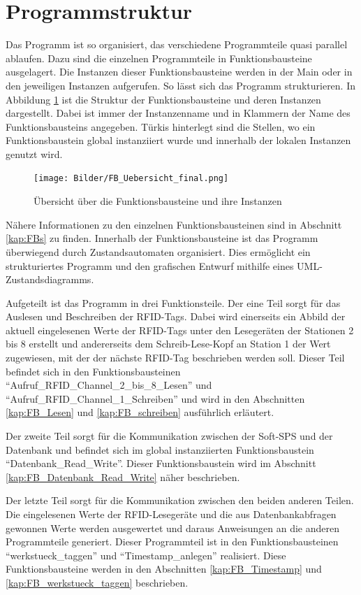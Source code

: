 \section{Programmstruktur}
\label{kap:KonzeptFertigungsueberwachung}
Das Programm ist so organisiert, das verschiedene Programmteile quasi parallel ablaufen. Dazu sind die einzelnen Programmteile in Funktionsbausteine ausgelagert. Die Instanzen dieser Funktionsbausteine werden in der Main oder in den jeweiligen Instanzen aufgerufen. So lässt sich das Programm strukturieren. In Abbildung \ref{fig:FB_Uebersicht} ist die Struktur der Funktionsbausteine und deren Instanzen dargestellt. Dabei ist immer der Instanzenname und in Klammern der Name des Funktionsbausteins angegeben. Türkis hinterlegt sind die Stellen, wo ein Funktionsbaustein global instanziiert wurde und innerhalb der lokalen Instanzen genutzt wird.
\begin{figure}[h]
	    \centering
	    \texttt{[image: Bilder/FB\_Uebersicht\_final.png]}
        \caption{Übersicht über die Funktionsbausteine und ihre Instanzen}
        \label{fig:FB_Uebersicht}
\end{figure}
Nähere Informationen zu den einzelnen Funktionsbausteinen sind in Abschnitt \ref{kap:FBs} zu finden. Innerhalb der Funktionsbausteine ist das Programm überwiegend durch Zustandsautomaten organisiert. Dies ermöglicht ein strukturiertes Programm und den grafischen Entwurf mithilfe eines UML-Zustandsdiagramms.

Aufgeteilt ist das Programm in drei Funktionsteile. Der eine Teil sorgt für das Auslesen und Beschreiben der RFID-Tags. Dabei wird einerseits ein Abbild der aktuell eingelesenen Werte der RFID-Tags unter den Lesegeräten der Stationen 2 bis 8 erstellt und andererseits dem Schreib-Lese-Kopf an Station 1 der Wert zugewiesen, mit der der nächste RFID-Tag beschrieben werden soll. Dieser Teil befindet sich in den Funktionsbausteinen "`Aufruf\_RFID\_Channel\_2\_bis\_8\_Lesen"' und "`Aufruf\_RFID\_Channel\_1\_Schreiben"' und wird in den Abschnitten \ref{kap:FB_Lesen} und \ref{kap:FB_schreiben} ausführlich erläutert. 

Der zweite Teil sorgt für die Kommunikation zwischen der Soft-SPS und der Datenbank und befindet sich im global instanziierten Funktionsbaustein "`Datenbank\_Read\_Write"'. Dieser Funktionsbaustein wird im Abschnitt \ref{kap:FB_Datenbank_Read_Write} näher beschrieben. 

Der letzte Teil sorgt für die Kommunikation zwischen den beiden anderen Teilen. Die eingelesenen Werte der RFID-Lesegeräte und die aus Datenbankabfragen gewonnen Werte werden ausgewertet und daraus Anweisungen an die anderen Programmteile generiert. Dieser Programmteil ist in den Funktionsbausteinen "`werkstueck\_taggen"' und "`Timestamp\_anlegen"' realisiert. Diese Funktionsbausteine werden in den Abschnitten \ref{kap:FB_Timestamp} und \ref{kap:FB_werkstueck_taggen} beschrieben.
